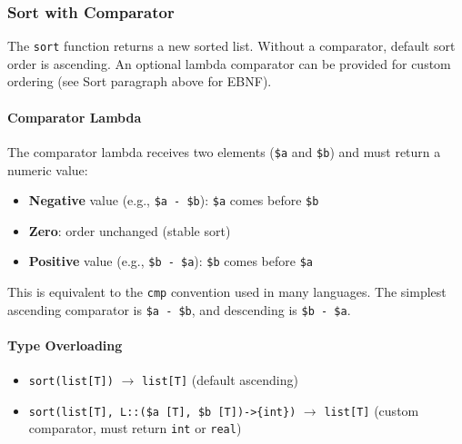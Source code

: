 \subsubsection{Sort with Comparator}
The \texttt{sort} function returns a new sorted list. Without a comparator, default sort order is ascending. An optional lambda comparator can be provided for custom ordering (see Sort paragraph above for EBNF).

\paragraph{Comparator Lambda}
The comparator lambda receives two elements (\texttt{\$a} and \texttt{\$b}) and must return a numeric value:
\begin{itemize}
\item \textbf{Negative} value (e.g., \texttt{\$a - \$b}): \texttt{\$a} comes before \texttt{\$b}
\item \textbf{Zero}: order unchanged (stable sort)
\item \textbf{Positive} value (e.g., \texttt{\$b - \$a}): \texttt{\$b} comes before \texttt{\$a}
\end{itemize}

This is equivalent to the \texttt{cmp} convention used in many languages. The simplest ascending comparator is \texttt{\$a - \$b}, and descending is \texttt{\$b - \$a}.

\paragraph{Type Overloading}
\begin{itemize}
\item \texttt{sort(list[T])} $\rightarrow$ \texttt{list[T]} (default ascending)
\item \texttt{sort(list[T], L::(\$a [T], \$b [T])->\{int\})} $\rightarrow$ \texttt{list[T]}
  (custom comparator, must return \texttt{int} or \texttt{real})
\end{itemize}

